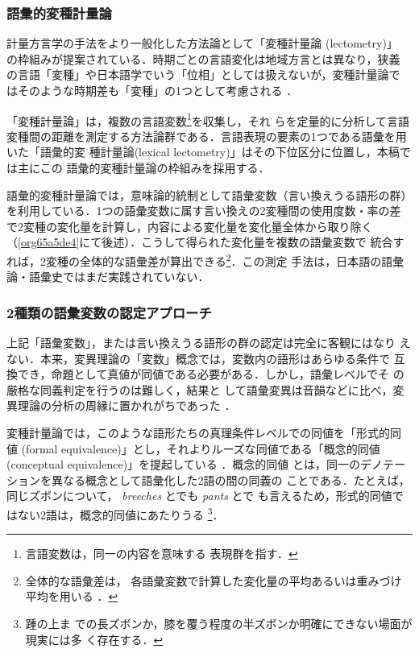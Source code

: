\documentclass[submit]{ipsj}
\renewcommand{\ref}{\cref}
\begin{document}
\subsubsection{語彙的変種計量論\label{org18482d1}}
\label{sec:org9f218aa}
計量方言学の手法をより一般化した方法論として「変種計量論 (lectometry)」
の枠組みが提案されている．時期ごとの言語変化は地域方言とは異なり，狭義
の言語「変種」や日本語学でいう「位相」としては扱えないが，変種計量論で
はそのような時期差も「変種」の1つとして考慮される
\cite{Geeraerts2023Lexical}．

「変種計量論」は，複数の言語変数\footnote{言語変数は，同一の内容を意味する
表現群を指す\cite[, 188]{Labov1972Sociolinguistic}．}を収集し，それ
らを定量的に分析して言語変種間の距離を測定する方法論群である\cite{Ruette2014Semantic}．言語表現の要素の1つである語彙を用いた「語彙的変
種計量論(lexical lectometry)」はその下位区分に位置し，本稿では主にこの
語彙的変種計量論の枠組みを採用する．

語彙的変種計量論では，意味論的統制として語彙変数（言い換えうる語形の群）
を利用している．1つの語彙変数に属す言い換えの2変種間の使用度数・率の差
で2変種の変化量を計算し，内容による変化量を変化量全体から取り除く
（\ref{org65a5de4}にて後述）．こうして得られた変化量を複数の語彙変数で
統合すれば，2変種の全体的な語彙差が算出できる\footnote{全体的な語彙差は，
各語彙変数で計算した変化量の平均あるいは重みづけ平均を用いる
\cite{Ruette2014Semantic,Speelman2003Profilebased}．}．この測定
手法は，日本語の語彙論・語彙史ではまだ実践されていない．
\subsubsection{2種類の語彙変数の認定アプローチ}
\label{sec:orgb723746}
上記「語彙変数」，または言い換えうる語形の群の認定は完全に客観にはなり
えない．本来，変異理論の「変数」概念では，変数内の語形はあらゆる条件で
互換でき，命題として真値が同値である必要がある．しかし，語彙レベルでそ
の厳格な同義判定を行うのは難しく\cite{Lavandera1978Where}，結果と
して語彙変異は音韻などに比べ，変異理論の分析の周縁に置かれがちであった
\cite{DePascale2019Tokenbased}．

変種計量論では，このような語形たちの真理条件レベルでの同値を「形式的同
値 (formal equivalence)」とし，それよりルーズな同値である「概念的同値
(conceptual equivalence)」を提起している
\cite{Geeraerts2023Lexical,DePascale2019Tokenbased}．概念的同値
とは，同一のデノテーションを異なる概念として語彙化した2語の間の同義の
ことである．たとえば，同じズボンについて， \emph{breeches} とでも \emph{pants} とで
も言えるため，形式的同値ではない2語は，概念的同値にあたりうる
\cite{DePascale2019Tokenbased,Geeraerts2023Lexical}\footnote{踵の上ま
での長ズボンか，膝を覆う程度の半ズボンか明確にできない場面が現実には多
く存在する．}．
\end{document}
